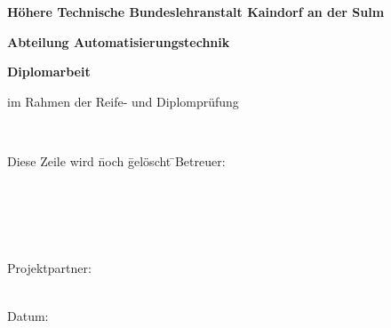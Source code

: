 \begin{titlepage}
	
	{\textbf {Höhere Technische Bundeslehranstalt Kaindorf an der Sulm}\par\vspace{0.3cm}}
	{\textbf {Abteilung Automatisierungstechnik}\par	\vspace{0.7cm}}
	\Large{\textbf{Diplomarbeit}}\par\vspace{0.2cm}
	\small im Rahmen der Reife- und Diplomprüfung\par
	\vspace{1.5cm}
	\Huge\textbf{\daTitle}\\
	\vspace{1cm}
	\vspace{1cm}
	\normalsize \daAuthorOne \par
	\normalsize \daAuthorTwo \par
	\normalsize \daAuthorThree \par
	\vspace{0,5cm}
	\daYear
	\vfill
	\begin{flushleft}
	\begin{tabbing}
	Diese Zeile wird \= noch \= gelöscht \=  \kill\vspace{0.2cm}Betreuer:\> \daSupervisorOne\par 
	\\\vspace{0.2cm}\> \daSupervisorTwo \par 
	\\\vspace{0.2cm}\> \daSupervisorThree \par 
	\\\vspace{0.2cm}Projektpartner:\> \daPartner \par
	\\Datum:\> \daDocDate
	\end{tabbing}
	\end{flushleft}
\end{titlepage}